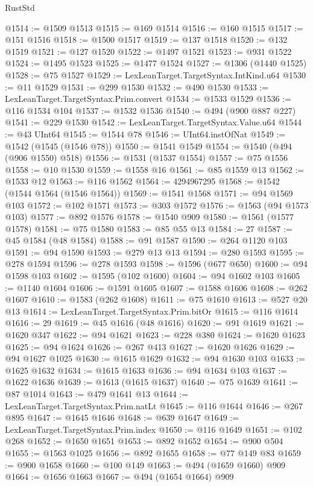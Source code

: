 \begin{lexlean}{RustStd}
\begin{coremodule}
{\begin{coremodule}
{{{{{{{{{{{{{{{{{{{{{{{{{{{{{{{{{{{{{@1514 := @1509 @1513
@1515 := @169 @1514
@1516 := @160 @1515
@1517 := @151 @1516
@1518 := @1500 @1517
@1519 := @137 @1518
@1520 := @132 @1519
@1521 := @127 @1520
@1522 := @1497 @1521
@1523 := @931 @1522
@1524 := @1495 @1523
@1525 := @1477 @1524
@1527 := @1306 (@1440 @1525)
@1528 := @75 @1527
@1529 := LexLeanTarget.TargetSyntax.IntKind.u64
@1530 := @11 @1529
@1531 := @299 @1530
@1532 := @490 @1530
@1533 := LexLeanTarget.TargetSyntax.Prim.convert
@1534 := @1533 @1529
@1536 := @116 @1534 @104
@1537 := @1532 @1536
@1540 := @494 (@900 @887 @227)
@1541 := @229 @1530
@1542 := LexLeanTarget.TargetSyntax.Value.u64
@1544 := @43 UInt64
@1545 := @1544 @78
@1546 := UInt64.instOfNat
@1549 := @1542 (@1545 (@1546 @78))
@1550 := @1541 @1549
@1554 := @1540 (@494 (@906 @1550) @518)
@1556 := @1531 (@1537 @1554)
@1557 := @75 @1556
@1558 := @10 @1530
@1559 := @1558 @16
@1561 := @85 @1559 @13
@1562 := @1533 @12
@1563 := @116 @1562
@1564 := 4294967295
@1568 := @1542 (@1544 @1564 (@1546 @1564))
@1569 := @1541 @1568
@1571 := @94 @1569 @103
@1572 := @102 @1571
@1573 := @303 @1572
@1576 := @1563 (@94 @1573 @103)
@1577 := @892 @1576
@1578 := @1540 @909
@1580 := @1561 (@1577 @1578)
@1581 := @75 @1580
@1583 := @85 @55 @13
@1584 := 27
@1587 := @45 @1584 (@48 @1584)
@1588 := @91 @1587
@1590 := @264 @1120 @103
@1591 := @94 @1590
@1593 := @279 @13 @13
@1594 := @280 @1593
@1595 := @278 @1594
@1596 := @278 @1593
@1598 := @1596 (@677 @650)
@1600 := @94 @1598 @103
@1602 := @1595 (@102 @1600)
@1604 := @94 @1602 @103
@1605 := @1140 @1604
@1606 := @1591 @1605
@1607 := @1588 @1606
@1608 := @262 @1607
@1610 := @1583 (@262 @1608)
@1611 := @75 @1610
@1613 := @527 @20 @13
@1614 := LexLeanTarget.TargetSyntax.Prim.bitOr
@1615 := @116 @1614
@1616 := 29
@1619 := @45 @1616 (@48 @1616)
@1620 := @91 @1619
@1621 := @1620 @347
@1622 := @94 @1621
@1623 := @228 @380
@1624 := @1620 @1623
@1625 := @94 @1624
@1626 := @267 @413
@1627 := @1620 @1626
@1629 := @94 @1627 @1025
@1630 := @1615 @1629
@1632 := @94 @1630 @103
@1633 := @1625 @1632
@1634 := @1615 @1633
@1636 := @94 @1634 @103
@1637 := @1622 @1636
@1639 := @1613 (@1615 @1637)
@1640 := @75 @1639
@1641 := @87 @1014
@1643 := @479 @1641 @13
@1644 := LexLeanTarget.TargetSyntax.Prim.natLt
@1645 := @116 @1644
@1646 := @267 @895
@1647 := @1645 @1646
@1648 := @639 @1647
@1649 := LexLeanTarget.TargetSyntax.Prim.index
@1650 := @116 @1649
@1651 := @102 @268
@1652 := @1650 @1651
@1653 := @892 @1652
@1654 := @900 @504
@1655 := @1563 @1025
@1656 := @892 @1655
@1658 := @77 @149 @83
@1659 := @900 @1658
@1660 := @100 @149
@1663 := @494 (@1659 @1660) @909
@1664 := @1656 @1663
@1667 := @494 (@1654 @1664) @909
}}}}}}}}}}}}}}}}}}}}}}}}}}}}}}}}}}}}}
\end{coremodule}}
\end{coremodule}
\end{lexlean}
